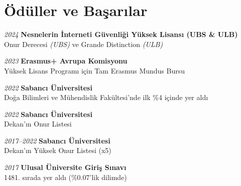 \section{Ödüller ve Başarılar}
\begin{onecolentry}
    \textit{2024} \textbf{Nesnelerin İnterneti Güvenliği Yüksek Lisansı (UBS \& ULB)}\\
    Onur Derecesi \textit{(UBS)} ve Grande Distinction \textit{(ULB)}
\end{onecolentry}
\vspace{\betweenentryspace}

\begin{onecolentry}
    \textit{2023} \textbf{Erasmus+ Avrupa Komisyonu}\\
    Yüksek Lisans Programı için Tam Erasmus Mundus Bursu
\end{onecolentry}
\vspace{\betweenentryspace}

\begin{onecolentry}
    \textit{2022} \textbf{Sabancı Üniversitesi}\\
    Doğa Bilimleri ve Mühendislik Fakültesi'nde ilk \%4 içinde yer aldı
\end{onecolentry}
\vspace{\betweenentryspace}

\begin{onecolentry}
    \textit{2022} \textbf{Sabancı Üniversitesi}\\
    Dekan'ın Onur Listesi
\end{onecolentry}
\vspace{\betweenentryspace}

\begin{onecolentry}
    \textit{2017–2022} \textbf{Sabancı Üniversitesi}\\
    Dekan'ın Yüksek Onur Listesi (x5)
\end{onecolentry}
\vspace{\betweenentryspace}

\begin{onecolentry}
    \textit{2017} \textbf{Ulusal Üniversite Giriş Sınavı}\\
    1481. sırada yer aldı (\%0.07'lik dilimde)
\end{onecolentry}
